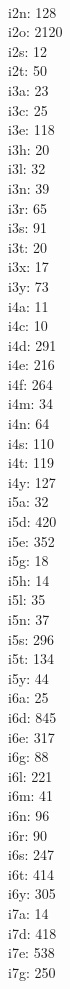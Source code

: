 \begin{multicols}{8}
  \\i2n: 128
  \\i2o: 2120
  \\i2s: 12
  \\i2t: 50
  \\i3a: 23
  \\i3c: 25
  \\i3e: 118
  \\i3h: 20
  \\i3l: 32
  \\i3n: 39
  \\i3r: 65
  \\i3s: 91
  \\i3t: 20
  \\i3x: 17
  \\i3y: 73
  \\i4a: 11
  \\i4c: 10
  \\i4d: 291
  \\i4e: 216
  \\i4f: 264
  \\i4m: 34
  \\i4n: 64
  \\i4s: 110
  \\i4t: 119
  \\i4y: 127
  \\i5a: 32
  \\i5d: 420
  \\i5e: 352
  \\i5g: 18
  \\i5h: 14
  \\i5l: 35
  \\i5n: 37
  \\i5s: 296
  \\i5t: 134
  \\i5y: 44
  \\i6a: 25
  \\i6d: 845
  \\i6e: 317
  \\i6g: 88
  \\i6l: 221
  \\i6m: 41
  \\i6n: 96
  \\i6r: 90
  \\i6s: 247
  \\i6t: 414
  \\i6y: 305
  \\i7a: 14
  \\i7d: 418
  \\i7e: 538
  \\i7g: 250

\end{multicols}
